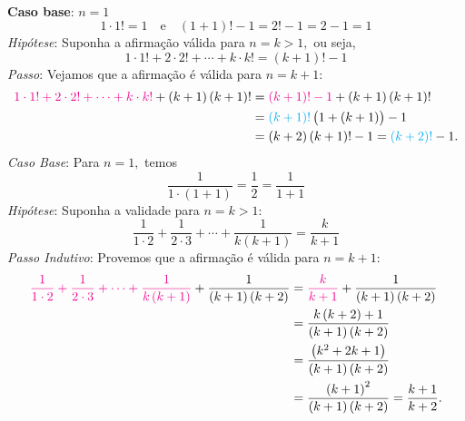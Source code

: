 \documentclass[12pt, a4paper]{article}
\newcommand{\negrito}[1]{\mbox{\boldmath{$#1$}}}
\newcommand{\alt}[1]{\textcolor{Floresta}{$\negrito{(#1)} $}}
\begin{document}
\begin{solution}
{\begin{align*}
\end{align*}
\task[\alt{c}] \textbf{Caso base}: $n=1$
$$1\cdot1!=1 \quad \mbox{e} \quad \left( 1+1 \right)!-1=2!-1=2-1=1$$
\textit{Hipótese}: Suponha a afirmação válida para $n=k>1,$ ou seja,
$$1\cdot1!+2\cdot2!+ \cdots +k\cdot k!= \left( k+1 \right) !-1$$
\textit{Passo}: Vejamos que a afirmação é válida para $n=k+1:$
\begin{align*}
\textcolor{Magenta}{1\cdot1!+2\cdot2!+ \cdots +k\cdot k!}+ \left( k+1 \right)  \left( k+1 \right) !&= \textcolor{Magenta}{\left( k+1 \right) !-1}+ \left( k+1 \right)  \left( k+1 \right) ! \\&=
\textcolor{Cyan}{\left( k+1 \right) !} \left( 1+(k+1) \right) -1\\&= \left( k+2 \right)  \left( k+1 \right) !-1= \textcolor{Cyan}{\left( k+2 \right) !}-1.
\end{align*}
\task[\alt{d}] \textit{Caso Base}: Para $n=1,$ temos
$$\frac{1}{1\cdot \left( 1+1 \right) }=\frac{1}{2}=\frac{1}{1+1}$$
\textit{Hipótese}: Suponha a validade para $n=k>1:$
$$\frac{1}{1\cdot2}+\frac{1}{2\cdot3}+ \cdots +\frac{1}{k \left( k+1 \right) }=\frac{k}{k+1}$$
\textit{Passo Indutivo}: Provemos que a afirmação é válida para $n=k+1:$
\begin{align*}
\textcolor{Magenta}{\frac{1}{1\cdot2}+\frac{1}{2\cdot3}+ \cdots +\frac{1}{k \left( k+1 \right) }}+\frac{1}{ \left( k+1 \right)  \left( k+2 \right) }&=\textcolor{Magenta}{\frac{k}{k+1}}+\frac{1}{ \left( k+1 \right)  \left( k+2 \right) }\\&=\frac{k \left( k+2 \right) +1}{ \left( k+1 \right)  \left( k+2 \right) }\\&=
\frac{ \left( k^{2}+2k+1 \right) }{ \left( k+1 \right)  \left( k+2 \right) }\\&=\frac{ \left( k+1 \right) ^{2}}{ \left( k+1 \right)  \left( k+2 \right) }=\frac{k+1}{k+2}.
\end{align*}


}
\end{solution}
\end{document}
